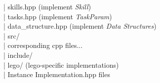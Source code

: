 \documentclass{article}
\begin{document}
\textbar\hspace{0.45cm}\textbar\hspace{0.45cm}\textbar | skills.hpp (implement \textit{Skill})\\
\textbar\hspace{0.45cm}\textbar\hspace{0.45cm}\textbar | 
tasks.hpp (implement \textit{TaskParam})\\
\textbar\hspace{0.45cm}\textbar\hspace{0.45cm}\textbar | 
data\_structure.hpp (implement \textit{Data Structures})\\
\textbar\hspace{0.45cm}\textbar | src/ \\
\textbar\hspace{0.45cm}\textbar\hspace{0.45cm}\textbar | corresponding cpp files... \\
\textbar\hspace{0.45cm}\textbar | include/ \\
\textbar\hspace{0.45cm}\textbar\hspace{0.45cm}\textbar | lego/ (lego-specific implementations) \\
\textbar\hspace{0.45cm}\textbar\hspace{0.45cm}\textbar | Instance Implementation.hpp files \\
 
\end{document}
